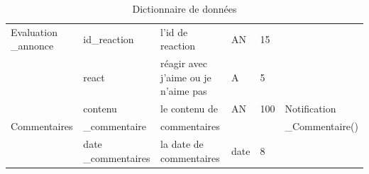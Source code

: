 \documentclass[edit,12pt,a4paper,ChapStyle,oneside,doubleinterligne]{report}
\begin{document}
\begin{table}[H]
    \centering
    \begin{tabular}{ | m{} | m{}| m{3cm} |m{}|m{}|l|}
    \hline            
                        Evaluation \_annonce&id\_reaction&l'id de reaction&AN&15& \\\cline{2-5}
                                            &react&réagir avec j'aime ou je n'aime pas&A&5& \\\hline


                                            &contenu&le contenu de &AN&100&Notification\\
                                Commentaires&\_commentaire&commentaires &  &   &\_Commentaire()\\\cline{2-5}
                                            &date \_commentaires&la date de commentaires&date&8&\\\hline

\end{tabular}
\caption{Dictionnaire de données}
\label{tab:Dictionnaire}
\end{table}
\end{document}
